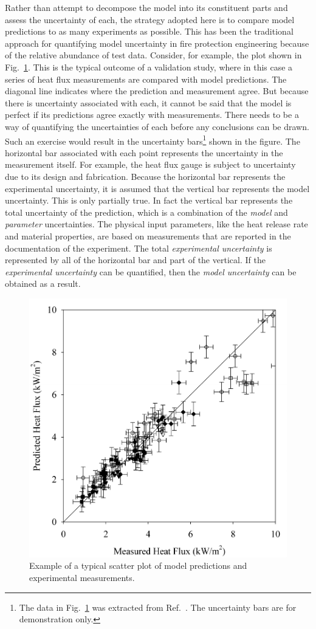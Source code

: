 Rather than attempt to decompose the model into its constituent parts and assess the uncertainty of
each, the strategy adopted here is to compare model predictions to as many
experiments as possible. This has been the traditional approach for quantifying model uncertainty in fire
protection engineering because of the relative abundance of test data. Consider, for example, the
plot shown in Fig.~\ref{scatterplot}. This is the typical outcome of a validation study, where in this case a series of
heat flux measurements are compared with model predictions.
The diagonal line indicates where the prediction and measurement agree.
But because there is uncertainty associated with each, it cannot be said that the model is perfect if its predictions
agree exactly with measurements.
There needs to be a way of quantifying the uncertainties of each before any conclusions can be drawn.
Such an exercise would result in the uncertainty
bars\footnote{The data in Fig.~\ref{scatterplot} was extracted from Ref.~\cite{NUREG_1824}.
The uncertainty bars are for demonstration only.}
shown in the figure. The
horizontal bar associated with each point represents the uncertainty in the measurement itself.
For example, the heat flux gauge is subject to uncertainty due to its design and fabrication.
Because the horizontal bar represents the experimental uncertainty, it is assumed that the vertical
bar represents the model uncertainty. This is only partially true. In fact the vertical bar represents the total
uncertainty of the prediction, which is a combination of the {\em model} and {\em parameter} uncertainties. The physical
input parameters, like the heat release rate and material properties, are based on measurements that are reported
in the documentation of the experiment.
The total {\em experimental uncertainty} is represented by all of the horizontal bar and part of the vertical.
If the {\em experimental uncertainty} can be quantified, then the {\em model uncertainty} can be obtained as a result.


\begin{figure}[t]
\begin{center}
\includegraphics[height=3.in]{FIGURES/scatterplot}
\end{center}
\caption[Sample scatter plot.]{Example of a typical scatter plot of model predictions and experimental measurements.}
\label{scatterplot}
\end{figure}


